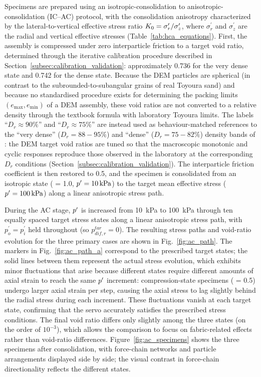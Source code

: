 Specimens are prepared using an isotropic-consolidation to anisotropic-consolidation (IC--AC) protocol, with the consolidation anisotropy characterized by the lateral-to-vertical effective stress ratio $K_0 = \sigma_r^{\prime}/\sigma_z^{\prime}$, where $\sigma_r^{\prime}$ and $\sigma_z^{\prime}$ are the radial and vertical effective stresses (Table~\ref{tab:hca_equations}). First, the assembly is compressed under zero interparticle friction to a target void ratio, determined through the iterative calibration procedure described in Section~\ref{subsec:calibration_validation}: approximately 0.736 for the very dense state and 0.742 for the dense state. Because the DEM particles are spherical (in contrast to the subrounded-to-subangular grains of real Toyoura sand) and because no standardised procedure exists for determining the packing limits $(e_{\max}, e_{\min})$ of a DEM assembly, these void ratios are not converted to a relative density through the textbook formula with laboratory Toyoura limits. The labels ``$D_r \approx 90\%$'' and ``$D_r \approx 75\%$'' are instead used as behaviour-matched references to the ``very dense'' ($D_r = 88\!-\!95\%$) and ``dense'' ($D_r = 75\!-\!82\%$) density bands of \citet{Ishihara1985}: the DEM target void ratios are tuned so that the macroscopic monotonic and cyclic responses reproduce those observed in the laboratory at the corresponding $D_r$ conditions (Section~\ref{subsec:calibration_validation}). The interparticle friction coefficient is then restored to 0.5, and the specimen is consolidated from an isotropic state (\Kzero{} = 1.0, $p^\prime=\SI{10}{kPa}$) to the target mean effective stress ($p^\prime=\SI{100}{kPa}$) along a linear anisotropic stress path.

During the AC stage, $p^\prime$ is increased from \SI{10}{kPa} to \SI{100}{kPa} through ten equally spaced target stress states along a linear anisotropic stress path, with $p_o^{\prime}=p_i^{\prime}$ held throughout (so $p_{dif,r}^{tar}=0$). The resulting stress paths and void-ratio evolution for the three primary cases are shown in Fig.~\ref{fig:ac_path}. The markers in Fig.~\ref{fig:ac_path_a} correspond to the prescribed target states; the solid lines between them represent the actual stress evolution, which exhibits minor fluctuations that arise because different \Kzero{} states require different amounts of axial strain to reach the same $p^\prime$ increment: compression-state specimens (\Kzero{} = 0.5) undergo larger axial strain per step, causing the axial stress to lag slightly behind the radial stress during each increment. These fluctuations vanish at each target state, confirming that the servo accurately satisfies the prescribed stress conditions. The final void ratio differs only slightly among the three states (on the order of $10^{-3}$), which allows the comparison to focus on fabric-related effects rather than void-ratio differences. Figure~\ref{fig:ac_specimens} shows the three specimens after consolidation, with force-chain networks and particle arrangements displayed side by side; the visual contrast in force-chain directionality reflects the different \Kzero{} states.

